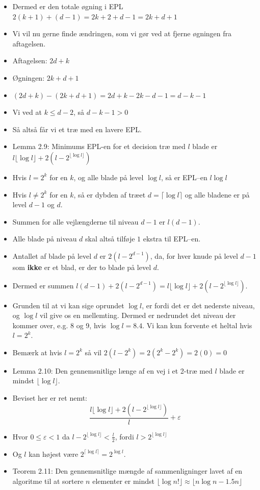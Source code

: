 \begin{frame}[allowframebreaks]
\begin{itemize}
	\item Dermed er den totale øgning i EPL $2(k+1)+(d-1)=2k+2+d-1=2k+d+1$
	\item Vi vil nu gerne finde ændringen, som vi gør ved at fjerne øgningen fra aftagelsen.
	\item Aftagelsen: $2d+k$
	\item Øgningen: $2k+d+1$
	\item $(2d+k)-(2k+d+1) = 2d+k-2k-d-1=d-k-1$
	\item Vi ved at $k \le d-2$, så $d-k-1 > 0 $
	\item Så altså får vi et træ med en lavere EPL.
	\item Lemma 2.9: Minimums EPL-en for et decision træ med $l$ blade er $l \lfloor \log l \rfloor + 2(l-2^{\lfloor \log l\rfloor })$
	\item Hvis $l = 2^{k}$  for en $k$, og alle blade på level $\log l$, så er EPL--en $l \log l$
	\item Hvis $l \ne 2^{k}$ for en $k$, så er dybden af træet $d = \lceil \log l \rceil$ og alle bladene er på level $d-1$ og $d$.
	\item Summen for alle vejlængderne til niveau $d-1$ er $l(d-1)$.
	\item Alle blade på niveau $d$ skal altså tilføje $1$ ekstra til EPL--en.
	\item Antallet af blade på level $d$ er $2(l-2^{d-1})$, da, for hver knude på level $d-1$ som \textbf{ikke} er et blad, er der to blade på level $d$.
	\item Dermed er summen $l(d-1)+2(l-2^{d-1}) = l \lfloor \log l \rfloor + 2(l-2^{\lfloor \log l \rfloor})$.
	\item Grunden til at vi kan sige oprundet $\log l$, er fordi det er det nederste niveau, og $\log l$ vil give os en mellemting. Dermed er nedrundet det niveau der kommer over, e.g. 8 og 9, hvis $\log l = 8.4$. Vi kan kun forvente et heltal hvis $l = 2^{k}$.
	\item Bemærk at hvis $l = 2^{k}$ så vil $2(l-2^{k}) = 2(2^{k}-2^{k}) = 2(0) = 0$
	\item Lemma 2.10: Den gennemsnitlige længe af en vej i et 2-træ med $l$ blade er mindst $\lfloor \log l \rfloor$.
	\item Beviset her er ret nemt:
		  \begin{equation}
\frac{l \lfloor \log l \rfloor + 2(l-2^{\lfloor \log l \rfloor})}{l} + \varepsilon
		  \end{equation}

	\item Hvor \(0 \le \varepsilon < 1\) da $l-2^{\lfloor \log l \rfloor }< \frac{l}{2}$, fordi $l > 2^{\lfloor \log l \rfloor}$
    \item Og $l$ kan højest være $2^{\lceil \log l \rceil} = 2^{\log l}$.
	\item Teorem 2.11: Den gennemsnitlige mængde af sammenligninger lavet af en algoritme til at sortere $n$ elementer er mindst $\lfloor \log n! \rfloor \approx \lfloor n \log n - 1.5n \rfloor$
  \end{itemize}
\end{frame}

